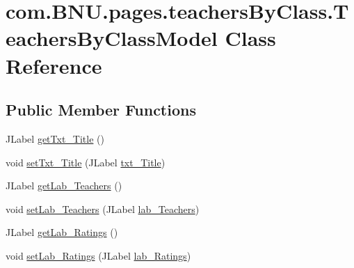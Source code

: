 \hypertarget{classcom_1_1_b_n_u_1_1pages_1_1teachers_by_class_1_1_teachers_by_class_model}{}\section{com.\+B\+N\+U.\+pages.\+teachers\+By\+Class.\+Teachers\+By\+Class\+Model Class Reference}
\label{classcom_1_1_b_n_u_1_1pages_1_1teachers_by_class_1_1_teachers_by_class_model}
\subsection*{Public Member Functions}
\begin{DoxyCompactItemize}
\item 
J\+Label \mbox{\hyperlink{classcom_1_1_b_n_u_1_1pages_1_1teachers_by_class_1_1_teachers_by_class_model_aa04c9f7fa370fbf8dba00fa3fedf0aae}{get\+Txt\+\_\+\+Title}} ()
\item 
void \mbox{\hyperlink{classcom_1_1_b_n_u_1_1pages_1_1teachers_by_class_1_1_teachers_by_class_model_a3f8a619b2b2d3b94343dda076f1bb4f0}{set\+Txt\+\_\+\+Title}} (J\+Label \mbox{\hyperlink{classcom_1_1_b_n_u_1_1pages_1_1teachers_by_class_1_1_teachers_by_class_model_a9fe5e127058b969dc4c805fba5bf30d3}{txt\+\_\+\+Title}})
\item 
J\+Label \mbox{\hyperlink{classcom_1_1_b_n_u_1_1pages_1_1teachers_by_class_1_1_teachers_by_class_model_acc5afee07fd2cd9750b59726a134f32f}{get\+Lab\+\_\+\+Teachers}} ()
\item 
void \mbox{\hyperlink{classcom_1_1_b_n_u_1_1pages_1_1teachers_by_class_1_1_teachers_by_class_model_a103b36451f0b74a8cfd237266f939094}{set\+Lab\+\_\+\+Teachers}} (J\+Label \mbox{\hyperlink{classcom_1_1_b_n_u_1_1pages_1_1teachers_by_class_1_1_teachers_by_class_model_abe153dd7f18bdeeb0085d2727a4ec106}{lab\+\_\+\+Teachers}})
\item 
J\+Label \mbox{\hyperlink{classcom_1_1_b_n_u_1_1pages_1_1teachers_by_class_1_1_teachers_by_class_model_a23d3717c60960c5895dcaaff729a7ee7}{get\+Lab\+\_\+\+Ratings}} ()
\item 
void \mbox{\hyperlink{classcom_1_1_b_n_u_1_1pages_1_1teachers_by_class_1_1_teachers_by_class_model_a5c0c3c9497d3ddc62c4666348c3ab2a1}{set\+Lab\+\_\+\+Ratings}} (J\+Label \mbox{\hyperlink{classcom_1_1_b_n_u_1_1pages_1_1teachers_by_class_1_1_teachers_by_class_model_a82200720196a8d25d4d3cf36686124e9}{lab\+\_\+\+Ratings}})
\item 

\end{DoxyCompactItemize}
